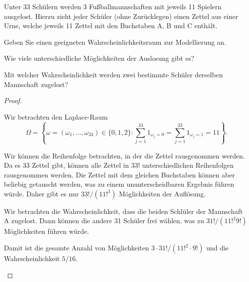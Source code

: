 \begin{Problem}
Unter 33 Schülern werden 3 Fußballmannschaften mit jeweils 11 Spielern ausgelost. Hierzu zieht jeder Schüler (ohne Zurücklegen) einen Zettel aus einer Urne, welche jeweils 11 Zettel mit den Buchstaben A, B und C enthält.	
\begin{parts}
\item Geben Sie einen geeigneten Wahrscheinlichkeitsraum zur Modellierung an.
\item Wie viele unterschiedliche Möglichkeiten der Auslosung gibt es?
\item Mit welcher Wahrscheinlichkeit werden zwei bestimmte Schüler derselben Mannschaft zugelost?
\end{parts}
\end{Problem}
\begin{proof}
	\begin{parts}
	\item Wir betrachten den Laplace-Raum
		\[
		\Omega=\left\{ \omega=(\omega_1, \dots, \omega_{33})\in \{0,1,2\}:\sum_{j=1}^{33}1_{\omega_j=0}=\sum_{j=1}^{33}1_{\omega_j=1}=11 \right\}  
		.\] 
	\item Wir können die Reihenfolge betrachten, in der die Zettel rausgenommen werden. Da es 33 Zettel gibt, können alle Zettel in $33!$ unterschiedlichen Reihenfolgen rausgenommen werden. Die Zettel mit dem gleichen Buchstaben können aber beliebig getauscht werden, was zu einem ununterscheidbaren Ergebnis führen würde. Daher gibt es nur $33! / (11!^3)$ Möglichkeiten der Auflösung.
	\item Wir betrachten die Wahrscheinlichkeit, dass die beiden Schlüler der Mannschaft A zugelost. Dann können die andere 31 Schüler frei wählen, was zu $31! / (11!^2 9!)$ Möglichkeiten führen würde.

		Damit ist die gesamte Anzahl von Möglichkeiten $3\cdot 31! / (11!^2\cdot 9!)$ und die Wahrscheinlichkeit $5 / 16$.\qedhere
	\end{parts}
\end{proof}
